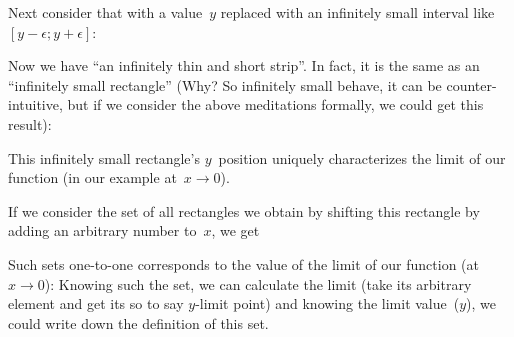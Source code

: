 Next consider that with a value~$y$ replaced with an infinitely small interval like $[y-\epsilon;y+\epsilon]$:
\begin{figure}[H]
\end{figure}

Now we have ``an infinitely thin and short strip''. In fact, it is the same as an ``infinitely small rectangle'' (Why? So infinitely small behave, it can be counter-intuitive, but if we consider the above meditations formally, we could get this result):
\begin{figure}[H]
\end{figure}

This infinitely small rectangle's $y$~position uniquely characterizes the limit of our function (in our example at~$x\to 0$).

If we consider the set of all rectangles we obtain by shifting this rectangle by adding an arbitrary number to~$x$, we get
\begin{figure}[H]
\end{figure}
Such sets one-to-one corresponds to the value of the limit of our function (at $x\to 0$): Knowing such the set, we can calculate the limit (take its arbitrary element and get its so to say $y$-limit point) and knowing the limit value~($y$), we could write down the definition of this set.

